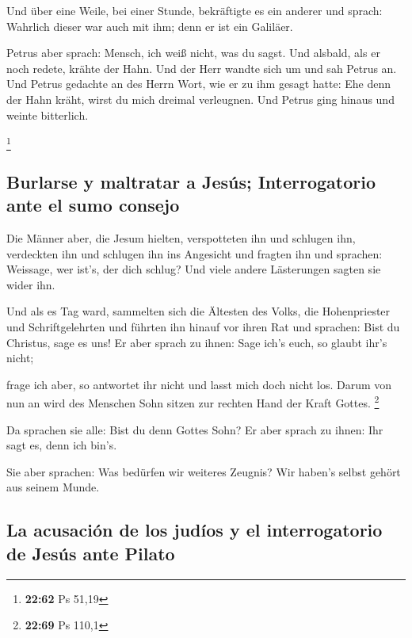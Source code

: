  Und über eine Weile, bei einer Stunde, bekräftigte es
ein anderer und sprach: Wahrlich dieser war auch mit ihm; denn er ist
ein Galiläer.

 Petrus aber sprach: Mensch, ich weiß nicht, was du
sagst. Und alsbald, als er noch redete, krähte der Hahn. 
Und der Herr wandte sich um und sah Petrus an. Und Petrus gedachte an
des Herrn Wort, wie er zu ihm gesagt hatte: Ehe denn der Hahn kräht,
wirst du mich dreimal verleugnen.  Und Petrus ging hinaus
und weinte bitterlich.

\footnote{\textbf{22:62} Ps 51,19}

\hypertarget{burlarse-y-maltratar-a-jesuxfas-interrogatorio-ante-el-sumo-consejo}{%
\subsection{Burlarse y maltratar a Jesús; Interrogatorio ante el sumo
consejo}\label{burlarse-y-maltratar-a-jesuxfas-interrogatorio-ante-el-sumo-consejo}}

 Die Männer aber, die Jesum hielten, verspotteten ihn und
schlugen ihn,  verdeckten ihn und schlugen ihn ins
Angesicht und fragten ihn und sprachen: Weissage, wer ist's, der dich
schlug?  Und viele andere Lästerungen sagten sie wider
ihn.

 Und als es Tag ward, sammelten sich die Ältesten des
Volks, die Hohenpriester und Schriftgelehrten und führten ihn hinauf vor
ihren Rat  und sprachen: Bist du Christus, sage es uns!
Er aber sprach zu ihnen: Sage ich's euch, so glaubt ihr's nicht;

 frage ich aber, so antwortet ihr nicht und lasst mich
doch nicht los.  Darum von nun an wird des Menschen Sohn
sitzen zur rechten Hand der Kraft Gottes. \footnote{\textbf{22:69} Ps
  110,1}

 Da sprachen sie alle: Bist du denn Gottes Sohn? Er aber
sprach zu ihnen: Ihr sagt es, denn ich bin's.

 Sie aber sprachen: Was bedürfen wir weiteres Zeugnis?
Wir haben's selbst gehört aus seinem Munde.

\hypertarget{la-acusaciuxf3n-de-los-juduxedos-y-el-interrogatorio-de-jesuxfas-ante-pilato}{%
\subsection{La acusación de los judíos y el interrogatorio de Jesús ante
Pilato}\label{la-acusaciuxf3n-de-los-juduxedos-y-el-interrogatorio-de-jesuxfas-ante-pilato}}

